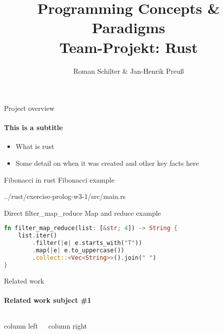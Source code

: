 \documentclass[aspectratio=169, professionalfonts]{beamer}
\title[PCP-Rust]{Programming Concepts \& Paradigms\\ Team-Projekt: Rust}
\author[Schilter \& Preuß]{Roman Schilter \& Jan-Henrik Preuß}
\newcommand{\mylisting}[6]{
    
    {#6}
}
\begin{document}
    \typesetFrontSlides



    \begin{frame}{Project overview}
        \framesubtitle{This is a subtitle}
        \begin{itemize}
            \item What is rust
            \item Some detail on when it was created and other key facts here
        \end{itemize}

    \end{frame}


    \begin{frame}{Fibonacci in rust}
        Fibonacci example

        \mylisting{22}{31}{Rust}{Rust}{Fibonacci recursive}{../rust/exercise-prolog-w3-1/src/main.rs}

    \end{frame}

    \begin{frame}[fragile]{Direct filter_map_reduce}
        Map and reduce example

        \begin{lstlisting}[language=Rust,escapechar=@,label={lst:map_reduce-test}]
fn filter_map_reduce(list: [&str; 4]) -> String {
    list.iter()
        .filter(|e| e.starts_with("T"))
        .map(|e| e.to_uppercase())
        .collect::<Vec<String>>().join(" ")
}\end{lstlisting}

    \end{frame}


    \begin{frame}{Related work}
        \framesubtitle{Related work subject \#1}
        \begin{columns}[T]

            column left

            column right
        \end{columns}


    \end{frame}
\end{document}
